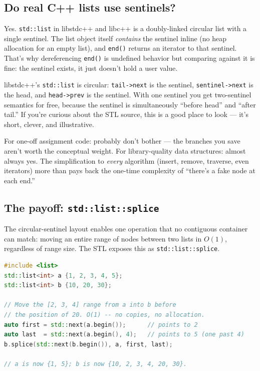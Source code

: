 \documentclass[11pt]{article}
\begin{document}
\subsection*{Do real C++ lists use sentinels?}

Yes. \texttt{std::list} in libstdc++ and libc++ is a doubly-linked
circular list with a single sentinel. The list object itself
\emph{contains} the sentinel inline (no heap allocation for
an empty list), and \texttt{end()} returns an iterator to that
sentinel. That's why dereferencing \texttt{end()} is undefined
behavior but comparing against it is fine: the sentinel exists,
it just doesn't hold a user value.

\begin{notebox}[Circular + sentinel = extremely clean]
libstdc++'s \texttt{std::list} is circular: \texttt{tail->next} is
the sentinel, \texttt{sentinel->next} is the head, and
\texttt{head->prev} is the sentinel. With one sentinel you get
two-sentinel semantics for free, because the sentinel is
simultaneously ``before head'' and ``after tail.'' If you're
curious about the STL source, this is a good place to look ---
it's short, clever, and illustrative.
\end{notebox}

\begin{ideabox}
For one-off assignment code: probably don't bother --- the
branches you save aren't worth the conceptual weight. For
library-quality data structures: almost always yes. The
simplification to \emph{every} algorithm (insert, remove,
traverse, even iterators) more than pays back the one-time
complexity of ``there's a fake node at each end.''
\end{ideabox}

\subsection*{The payoff: \texttt{std::list::splice}}

The circular-sentinel layout enables one operation that no
contiguous container can match: moving an entire range of nodes
between two lists in $O(1)$, regardless of range size. The STL
exposes this as \texttt{std::list::splice}.

\begin{examplebox}
\begin{lstlisting}[language=C++,basicstyle=\ttfamily\small,frame=single]
#include <list>
std::list<int> a {1, 2, 3, 4, 5};
std::list<int> b {10, 20, 30};

// Move the [2, 3, 4] range from a into b before
// the position of 20. O(1) -- no copies, no allocation.
auto first = std::next(a.begin());      // points to 2
auto last  = std::next(a.begin(), 4);   // points to 5 (one past 4)
b.splice(std::next(b.begin()), a, first, last);

// a is now {1, 5}; b is now {10, 2, 3, 4, 20, 30}.
\end{lstlisting}
\end{examplebox}
\end{document}
